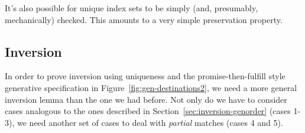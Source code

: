 It's also possible for unique index sets to be simply (and,
presumably, mechanically) checked. This amounts to a very simple
preservation property.

\subsection{Inversion}

In order to prove inversion using uniqueness and the
promise-then-fulfill style generative specification in
Figure~\ref{fig:gen-destinations2}, we need a more general inversion
lemma than the one we had before. Not only do we have to consider
cases analogous to the ones described in
Section~\ref{sec:inversion-genorder} (cases 1-3), we need another set
of cases to deal with {\it partial} matches (cases 4 and 5). 

